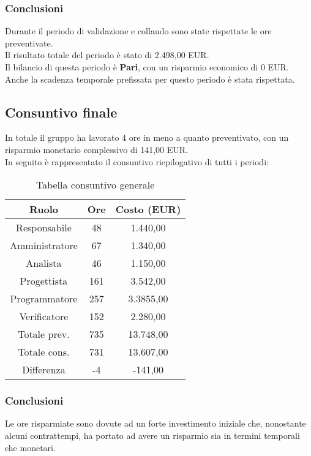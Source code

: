 \subsubsection{Conclusioni}
Durante il periodo di validazione e collaudo sono state rispettate le ore preventivate. \\
Il risultato totale del periodo è stato di 2.498,00 EUR.
\\Il bilancio di questa periodo è \textbf{Pari}, con un risparmio economico di 0 EUR. Anche la scadenza temporale prefissata per questo periodo è stata rispettata.

\subsection{Consuntivo finale}
In totale il gruppo ha lavorato 4 ore in meno a quanto preventivato, con un risparmio monetario complessivo di 141,00 EUR. \\
In seguito è rappresentato il consuntivo riepilogativo di tutti i periodi:
\begin{table}[h]
	\caption{Tabella consuntivo generale}  
	\begin{center}
		\begin{tabular}{ |c|c|c|  }
			\hline
			Ruolo 			& Ore 	& Costo (EUR)\\
			\hline\hline
			Responsabile	& 48	& 1.440,00\\
			Amministratore	& 67	& 1.340,00\\
			Analista		& 46	& 1.150,00\\
			Progettista		& 161	& 3.542,00\\
			Programmatore	& 257	& 3.3855,00\\
			Verificatore	& 152	& 2.280,00\\
			\hline\hline
			Totale prev.	& 735	& 13.748,00 \\
			Totale cons.	& 731	& 13.607,00 \\
			Differenza		& -4	& -141,00 \\
			\hline
		\end{tabular}
	\end{center}
\end{table}

\newpage
\subsubsection{Conclusioni}
Le ore risparmiate sono dovute ad un forte investimento iniziale che, nonostante alcuni contrattempi, ha portato ad avere un risparmio sia in termini temporali che monetari.